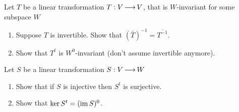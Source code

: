 \documentclass[12pt]{amsart}
\begin{document}
	Let $T$ be a linear transformation $T: V \operatorname{\longrightarrow} V$, that is $W$-invariant for some subspace $W$
	\begin{enumerate}
		\item Suppose $T$ is invertible. Show that $(\bar T)^{-1} = \overline {T^{-1}} $.
		\item Show that $T^t$ is $W^0$-invariant (don't assume invertible anymore).
	\end{enumerate}

	Let $S$ be a linear transformation $S: V \operatorname{\longrightarrow} W$	
	
	\begin{enumerate}
		\item Show that if $S$ is injective then $S^t$ is surjective.
		\item Show that $\ker S^t = (\operatorname{im} S)^0$.
	\end{enumerate}
\end{document}
